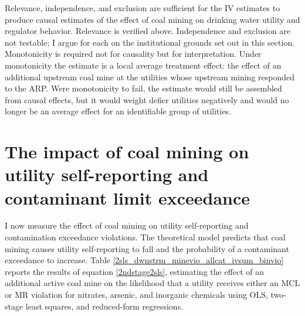 \documentclass[12pt]{article}
\begin{document}
Relevance, independence, and exclusion are sufficient for the IV estimates to produce causal estimates of the effect of coal mining on drinking water utility and regulator behavior. Relevance is verified above. Independence and exclusion are not testable; I argue for each on the institutional grounds set out in this section. Monotonicity is required not for causality but for interpretation. Under monotonicity the estimate is a local average treatment effect: the effect of an additional upstream coal mine at the utilities whose upstream mining responded to the ARP. Were monotonicity to fail, the estimate would still be assembled from causal effects, but it would weight defier utilities negatively and would no longer be an average effect for an identifiable group of utilities.

\section{The impact of coal mining on utility self-reporting and contaminant limit exceedance}\label{sec:violations}

I now measure the effect of coal mining on utility self-reporting and contamination exceedance violations. The theoretical model predicts that coal mining causes utility self-reporting to fall and the probability of a contaminant exceedance to increase. Table \ref{2sls_dwnstrm_minevio_allcat_ivsum_binvio} reports the results of equation \ref{2ndstage2sls}, estimating the effect of an additional active coal mine on the likelihood that a utility receives either an MCL or MR violation for nitrates, arsenic, and inorganic chemicals using OLS, two-stage least squares, and reduced-form regressions.

\end{document}
